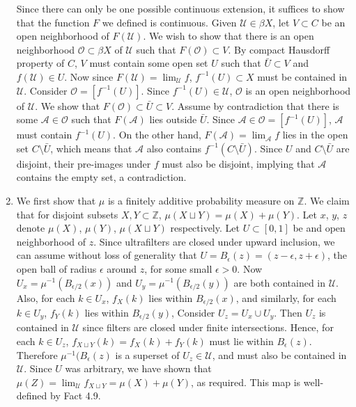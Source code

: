 \documentclass{article}
\begin{document}
\begin{enumerate}
    Since there can only be one possible continuous extension, it suffices
    to show that the function $F$ we defined is continuous. Given
    $\mathcal{U}\in\beta X$, let $V\subset C$ be an open neighborhood of
    $F(\mathcal{U})$. We wish to show that there is an open neighborhood
    $\mathcal{O}\subset\beta X$ of $\mathcal{U}$ such that
    $F(\mathcal{O})\subset V$. By compact Hausdorff property of $C$, $V$
    must contain some open set $U$ such that $\bar{U}\subset V$ and
    $f(\mathcal{U})\in U$. Now since $F(\mathcal{U})=\lim_{\mathcal{U}}f$,
    $f^{-1}(U)\subset X$ must be contained in $\mathcal{U}$. Consider
    $\mathcal{O}=[f^{-1}(U)]$. Since $f^{-1}(U)\in\mathcal{U}$,
    $\mathcal{O}$ is an open neighborhood of $\mathcal{U}$. We show that
    $F(\mathcal{O})\subset\bar{U}\subset V$. Assume by contradiction that
    there is some $\mathcal{A}\in\mathcal{O}$ such that $F(\mathcal{A})$
    lies outside $\bar{U}$. Since $\mathcal{A}\in\mathcal{O}=[f^{-1}(U)]$,
    $\mathcal{A}$ must contain $f^{-1}(U)$. On the other hand,
    $F(\mathcal{A})=\lim_{\mathcal{A}}f$ lies in the open set
    $C\setminus\bar{U}$, which means that $\mathcal{A}$ also contains
    $f^{-1}(C\setminus\bar{U})$. Since $U$ and $C\setminus\bar{U}$ are
    disjoint, their pre-images under $f$ must also be disjoint, implying
    that $\mathcal{A}$ contains the empty set, a contradiction.

  \item We first show that $\mu$ is a finitely additive probability
    measure on $\mathbb{Z}$. We claim that for disjoint subsets
    $X,Y\subset\mathbb{Z}$, $\mu(X\sqcup Y)=\mu(X)+\mu(Y)$. Let $x$, $y$,
    $z$ denote $\mu(X)$, $\mu(Y)$, $\mu(X\sqcup Y)$ respectively. Let
    $U\subset[0,1]$ be and open neighborhood of $z$. Since ultrafilters are
    closed under upward inclusion, we can assume without loss of generality
    that $U=B_\epsilon(z)=(z-\epsilon,z+\epsilon)$, the open ball of radius
    $\epsilon$ around $z$, for some small $\epsilon>0$. Now
    $U_x=\mu^{-1}(B_{\epsilon/2}(x))$ and $U_y=\mu^{-1}(B_{\epsilon/2}(y))$
    are both contained in $\mathcal{U}$. Also, for each $k\in U_x$,
    $f_X(k)$ lies within $B_{\epsilon/2}(x)$, and similarly, for each $k\in
    U_y$, $f_Y(k)$ lies within $B_{\epsilon/2}(y)$, Consider $U_z=U_x\cup
    U_y$. Then $U_z$ is contained in $\mathcal{U}$ since filters are closed
    under finite intersections. Hence, for each $k\in U_z$, $f_{X\sqcup
    Y}(k)=f_X(k)+f_Y(k)$ must lie within $B_\epsilon(z)$. Therefore
    $\mu^{-1}(B_\epsilon(z)$ is a superset of $U_z\in\mathcal{U}$, and must
    also be contained in $\mathcal{U}$. Since $U$ was arbitrary, we have
    shown that $\mu(Z)=\lim_\mathcal{U}f_{X\sqcup Y}=\mu(X)+\mu(Y)$, as
    required. This map is well-defined by Fact 4.9. \\


\end{enumerate}
\end{document}
